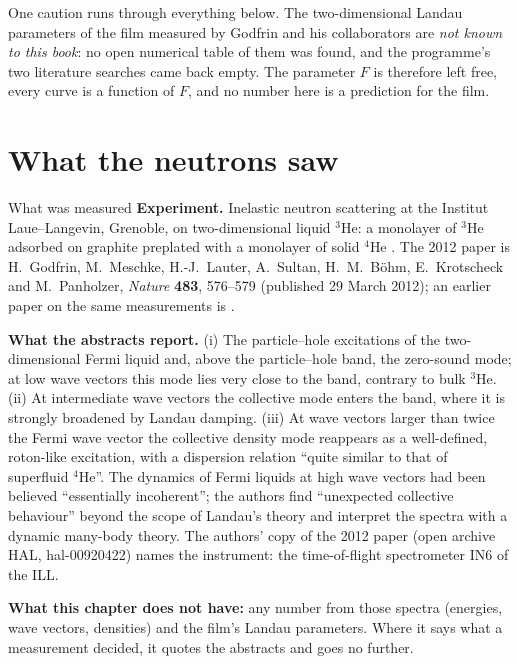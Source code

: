 One caution runs through everything below.
The two-dimensional Landau parameters of the film measured by Godfrin and his collaborators are \emph{not known to this book}: no open numerical table of them was found, and the programme's two literature searches came back empty.
The parameter $F$ is therefore left free, every curve is a function of $F$, and no number here is a prediction for the film.

\section{What the neutrons saw}\label{ch08:sec-measure}

\begin{godfrinbox}{What was measured}
\textbf{Experiment.} Inelastic neutron scattering at the Institut Laue--Langevin, Grenoble, on two-dimensional liquid $^3$He: a monolayer of $^3$He adsorbed on graphite preplated with a monolayer of solid $^4$He \cite{Godfrin2010,Godfrin2012}.
The 2012 paper is H.~Godfrin, M.~Meschke, H.-J.~Lauter, A.~Sultan, H.~M.~B\"ohm, E.~Krotscheck and M.~Panholzer, \emph{Nature} \textbf{483}, 576--579 (published 29 March 2012); an earlier paper on the same measurements is \cite{Godfrin2010}.\par\vspace{2pt}
\textbf{What the abstracts report.}
(i) The particle--hole excitations of the two-dimensional Fermi liquid and, above the particle--hole band, the zero-sound mode; at low wave vectors this mode lies very close to the band, contrary to bulk $^3$He.
(ii) At intermediate wave vectors the collective mode enters the band, where it is strongly broadened by Landau damping.
(iii) At wave vectors larger than twice the Fermi wave vector the collective density mode reappears as a well-defined, roton-like excitation, with a dispersion relation ``quite similar to that of superfluid $^4$He''.
The dynamics of Fermi liquids at high wave vectors had been believed ``essentially incoherent''; the authors find ``unexpected collective behaviour'' beyond the scope of Landau's theory and interpret the spectra with a dynamic many-body theory.
The authors' copy of the 2012 paper (open archive HAL, hal-00920422) names the instrument: the time-of-flight spectrometer IN6 of the ILL.\par\vspace{2pt}
\textbf{What this chapter does not have:} any number from those spectra (energies, wave vectors, densities) and the film's Landau parameters. Where it says what a measurement decided, it quotes the abstracts and goes no further.
\end{godfrinbox}

